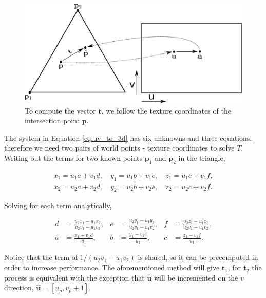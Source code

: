 \documentclass[12pt]{article}
\begin{document}
\begin{figure}[ht!]
\centering
\includegraphics[width=\textwidth]{images/thread_3d_coord}
	\caption{To compute the vector $\mathbf{t}$, we follow the texture coordinates of the intersection point $\mathbf{p}$.}
	\label{fig:thread_uv_coord}
\end{figure}

The system in Equation \ref{eq:uv_to_3d} has six unknowns and three equations, therefore we need two pairs of world points - texture coordinates to solve $T$.
Writing out the terms for two known points $\mathbf{p}_1$ and $\mathbf{p}_2$ in the triangle,

\begin{equation}
\begin{split}
x_1 = u_1 a + v_1 d, \quad y_1 = u_1 b + v_1 e, \quad z_1 = u_1 c + v_1 f,\\
x_2 = u_2 a + v_2 d, \quad y_2 = u_2 b + v_2 e, \quad z_2 = u_2 c + v_2 f.
\end{split}
\end{equation}

Solving for each term analytically,

\begin{align}
d& = \frac{u_2 x_1 - u_1 x_2}{u_2 v_1 - u_1 v_2},& e& = \frac{u_2 y_1 - u_1 y_2}{u_2 v_1 - u_1 v_2},& f& = \frac{u_2 z_1 - u_1 z_2}{u_2 v_1 - u_1 v_2}, \\
a& = \frac{x_1 - v_1 d}{u_1},& b& = \frac{y_1 - v_1 e}{u_1},&  c& = \frac{z_1 - v_1 f}{u_1}.
\end{align}

Notice that the term of $1/(u_2 v_1 - u_1 v_2)$ is shared, so it can be precomputed in order to increase performance.
The aforementioned method will give $\mathbf{t}_1$, for $\mathbf{t}_2$ the process is equivalent with the exception that $\hat{\mathbf{u}}$ will be incremented on the $v$ direction, $\hat{\mathbf{u}} = \left[ u_p, v_p + 1\right]$.
\end{document}
